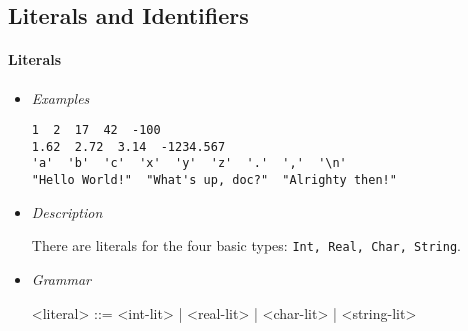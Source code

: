 \documentclass[diploma]{softlab-thesis}
\begin{document}
\subsection{Literals and Identifiers}
\label{subsubsec:litsandidents}

\paragraph{Literals}
\begin{itemize}

\item \textit{Examples}
\begin{verbatim}
1  2  17  42  -100
1.62  2.72  3.14  -1234.567
'a'  'b'  'c'  'x'  'y'  'z'  '.'  ','  '\n'
"Hello World!"  "What's up, doc?"  "Alrighty then!"
\end{verbatim}

\item \textit{Description}

There are literals for the four basic types: \texttt{Int, Real, Char, String}.

\item \textit{Grammar}
\begin{grammar}
<literal> ::= <int-lit> | <real-lit> | <char-lit> | <string-lit>
\end{grammar}

\end{itemize}
\end{document}
